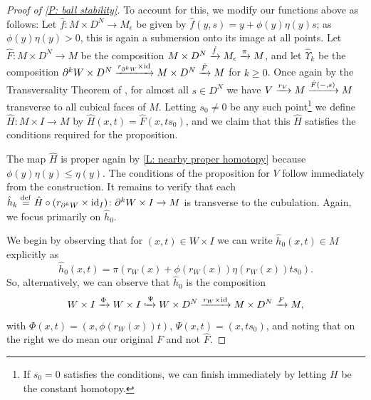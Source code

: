 \begin{proof}[Proof of \cref{P: ball stability}]
	To account for this, we modify our functions above as follows: Let $\hat f \colon M \times D^N \to M_\epsilon$ be given by $\hat f(y, s) = y + \phi(y) \eta(y) s$; as $\phi(y)\eta(y)>0$, this is again a submersion onto its image at all points.
	Let $\hat F \colon M \times D^N \to M$ be the composition $M \times D^N \xrightarrow{\hat f}M_\epsilon \xrightarrow{\pi}M$, and let $\hat \Upsilon_k$ be the composition $\partial^kW \times D^N \xrightarrow{r_{\partial^kW} \times \mathrm{id}}M \times D^N \xrightarrow{\hat F} M$ for $k\geq 0$.
	Once again by the Transversality Theorem of \cite[Section 2.3]{GuPo74}, for almost all $s \in D^N$ we have $V \xrightarrow{r_V} M \xrightarrow{\hat F(-,s)} M$ transverse to all cubical faces of $M$.
	Letting $s_0 \neq 0$ be any such point\footnote{If $s_0 = 0$ satisfies the conditions, we can finish immediately by letting $H$ be the constant homotopy.} we define $\hat H \colon M \times I \to M$ by $\hat H(x,t) = \hat F(x,ts_0)$, and we claim that this $\hat H$ satisfies the conditions required for the proposition.

	The map $\hat H$ is proper again by \cref{L: nearby proper homotopy} because $\phi(y) \eta(y) \leq \eta(y)$.
	The conditions of the proposition for $V$ follow immediately from the construction.
	It remains to verify that each $\hat h_k \stackrel{\mathrm{def}}{=} \hat H \circ (r_{\partial^k W} \times \mathrm{id}_I) \colon \partial^k W \times I \to M$ is transverse to the cubulation.
	Again, we focus primarily on $\hat h_0$.

	We begin by observing that for $(x,t) \in W \times I$ we can write $\hat h_0(x,t) \in M$ explicitly as
	$$\hat h_0(x,t) = \pi(r_W(x)+\phi(r_W(x))\eta(r_W(x))ts_0).$$
	So, alternatively, we can observe that $\hat h_0$ is the composition
	\begin{equation}\label{E: alt hat h}
		W \times I \xrightarrow{\Phi} W \times I \xhookrightarrow{\Psi} W \times D^N \xrightarrow{r_W \times \mathrm{id}} M \times D^N \xrightarrow{F} M,
	\end{equation}
	with $\Phi(x,t) = (x,\phi(r_W(x))t)$, $\Psi(x,t) = (x,ts_0)$, and noting that on the right we do mean our original $F$ and not $\hat F$.


\end{proof}
